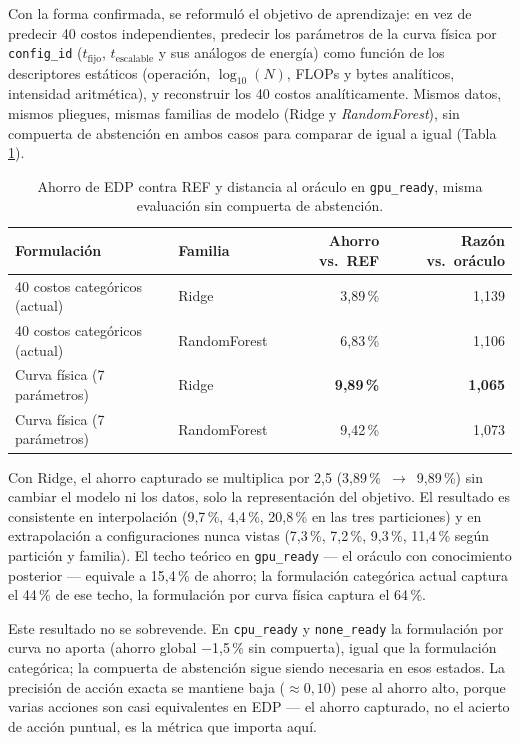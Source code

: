 \documentclass[12pt,oneside,spanish]{book}
\begin{document}
Con la forma confirmada, se reformuló el objetivo de aprendizaje: en vez de predecir 40 costos independientes, predecir los parámetros de la curva física por \texttt{config\_id} ($t_{\text{fijo}}$, $t_{\text{escalable}}$ y sus análogos de energía) como función de los descriptores estáticos (operación, $\log_{10}(N)$, FLOPs y bytes analíticos, intensidad aritmética), y reconstruir los 40 costos analíticamente. Mismos datos, mismos pliegues, mismas familias de modelo (Ridge y \textit{RandomForest}), sin compuerta de abstención en ambos casos para comparar de igual a igual (Tabla \ref{tab:r3-curva-comparacion}).

\begin{table}[H]
\centering
\caption[Representación categórica frente a curva física, sin compuerta]{Ahorro de EDP contra REF y distancia al oráculo en \texttt{gpu\_ready}, misma evaluación sin compuerta de abstención.}
\label{tab:r3-curva-comparacion}
\begin{tabular}{llrr}
\toprule
\textbf{Formulación} & \textbf{Familia} & \textbf{Ahorro vs.\ REF} & \textbf{Razón vs.\ oráculo} \\
\midrule
40 costos categóricos (actual) & Ridge         & 3,89\,\% & 1,139 \\
40 costos categóricos (actual) & RandomForest  & 6,83\,\% & 1,106 \\
Curva física (7 parámetros)    & Ridge         & \textbf{9,89\,\%} & \textbf{1,065} \\
Curva física (7 parámetros)    & RandomForest  & 9,42\,\% & 1,073 \\
\bottomrule
\end{tabular}
\end{table}

Con Ridge, el ahorro capturado se multiplica por 2,5 (3,89\,\%~$\to$~9,89\,\%) sin cambiar el modelo ni los datos, solo la representación del objetivo. El resultado es consistente en interpolación (9,7\,\%, 4,4\,\%, 20,8\,\% en las tres particiones) y en extrapolación a configuraciones nunca vistas (7,3\,\%, 7,2\,\%, 9,3\,\%, 11,4\,\% según partición y familia). El techo teórico en \texttt{gpu\_ready} --- el oráculo con conocimiento posterior --- equivale a 15,4\,\% de ahorro; la formulación categórica actual captura el 44\,\% de ese techo, la formulación por curva física captura el 64\,\%.

Este resultado no se sobrevende. En \texttt{cpu\_ready} y \texttt{none\_ready} la formulación por curva no aporta (ahorro global $-$1,5\,\% sin compuerta), igual que la formulación categórica; la compuerta de abstención sigue siendo necesaria en esos estados. La precisión de acción exacta se mantiene baja ($\approx 0{,}10$) pese al ahorro alto, porque varias acciones son casi equivalentes en EDP --- el ahorro capturado, no el acierto de acción puntual, es la métrica que importa aquí.
\end{document}
